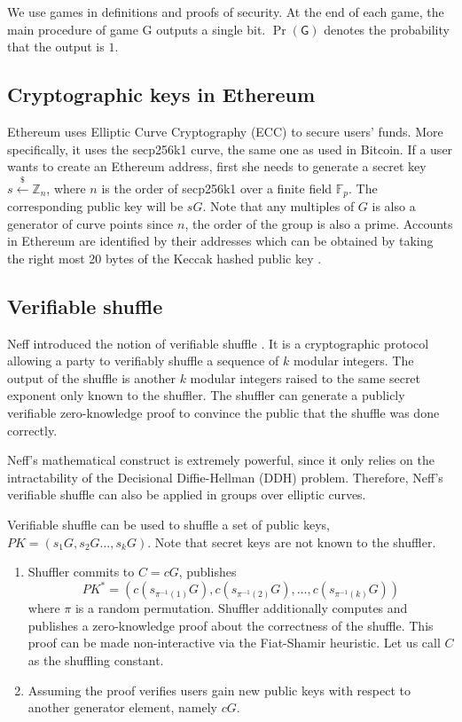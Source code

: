 \documentclass[a4paper]{article}
\theoremstyle{definition}
\begin{document}
We use games in definitions and proofs of security. At the end of each game, the main procedure of game \textsf{G} outputs a single bit. $\Pr(\textsf{G})$ denotes the probability that the output is $1$.
\subsection{Cryptographic keys in Ethereum}
Ethereum uses Elliptic Curve Cryptography (ECC) to secure users' funds. More specifically, it uses the secp256k1 curve, the same one as used in Bitcoin. If a user wants to create an Ethereum address, first she needs to generate a secret key  $s\stackrel{\$}{\leftarrow}\mathbb{Z}_n$, where $n$ is the order of secp256k1 over a finite field $\mathbb{F}_{p}$. The corresponding public key will be $sG$. Note that any multiples of $G$ is also a generator of curve points since $n$, the order of the group is also a prime. Accounts in Ethereum are identified by their addresses which can be obtained by taking the right most 20 bytes of the Keccak hashed public key \cite{wood2014ethereum}. 
    
\subsection{Verifiable shuffle}

Neff introduced the notion of verifiable shuffle \cite{neff2001verifiable}. It is a cryptographic protocol allowing a party to verifiably shuffle a sequence of $k$ modular integers. The output of the shuffle is another $k$ modular integers raised to the same secret exponent only known to the shuffler. The shuffler can generate a publicly verifiable zero-knowledge proof to convince the public that the shuffle was done correctly. 

Neff's mathematical construct is extremely powerful, since it only relies on the intractability of the Decisional Diffie-Hellman (DDH) problem. Therefore, Neff's verifiable shuffle can also be applied in groups over elliptic curves.

Verifiable shuffle can be used to shuffle a set of public keys, $PK=(s_{1}G,s_{2}G\dots,s_{k}G)$. Note that secret keys are not known to the shuffler.

\begin{enumerate}
	\item Shuffler commits to $C=cG$, publishes $$PK^*=(c(s_{\pi^{-1}(1)}G),c(s_{\pi^{-1}(2)}G),\dots,c({s_{\pi^{-1}(k)}}G))$$ where $\pi$ is a random permutation. Shuffler additionally computes and publishes a zero-knowledge proof about the correctness of the shuffle. This proof can be made non-interactive via the Fiat-Shamir heuristic. Let us call $C$ as the shuffling constant.
	\item Assuming the proof verifies users gain new public keys with respect to another generator element, namely $cG$.
\end{enumerate}
\end{document}
